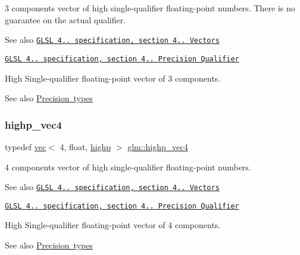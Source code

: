 3 components vector of high single-\/qualifier floating-\/point numbers. There is no guarantee on the actual qualifier.

\begin{DoxySeeAlso}{See also}
\href{http://www.opengl.org/registry/doc/GLSLangSpec.4.20.8.pdf}{\tt G\+L\+SL 4.. specification, section 4.. Vectors} 

\href{http://www.opengl.org/registry/doc/GLSLangSpec.4.20.8.pdf}{\tt G\+L\+SL 4.. specification, section 4.. Precision Qualifier}
\end{DoxySeeAlso}
High Single-\/qualifier floating-\/point vector of 3 components. \begin{DoxySeeAlso}{See also}
\mbox{\hyperlink{group__core__precision}{Precision types}} 
\end{DoxySeeAlso}
\mbox{\label{group__core__precision_ga27638826fa491205403b39198c49e9f5}} 
\subsubsection{\texorpdfstring{highp\+\_\+vec4}{highp\_vec4}}
{\footnotesize\ttfamily typedef \mbox{\hyperlink{structglm_1_1vec}{vec}}$<$ 4, float, \mbox{\hyperlink{namespaceglm_a36ed105b07c7746804d7fdc7cc90ff25ac6f7eab42eacbb10d59a58e95e362074}{highp}} $>$ \mbox{\hyperlink{group__core__precision_ga27638826fa491205403b39198c49e9f5}{glm\+::highp\+\_\+vec4}}}

4 components vector of high single-\/qualifier floating-\/point numbers.

\begin{DoxySeeAlso}{See also}
\href{http://www.opengl.org/registry/doc/GLSLangSpec.4.20.8.pdf}{\tt G\+L\+SL 4.. specification, section 4.. Vectors} 

\href{http://www.opengl.org/registry/doc/GLSLangSpec.4.20.8.pdf}{\tt G\+L\+SL 4.. specification, section 4.. Precision Qualifier}
\end{DoxySeeAlso}
High Single-\/qualifier floating-\/point vector of 4 components. \begin{DoxySeeAlso}{See also}
\mbox{\hyperlink{group__core__precision}{Precision types}} 
\end{DoxySeeAlso}
\mbox{\label{group__core__precision_gacd01d170508f812968875b0f2e730e8c}} 

